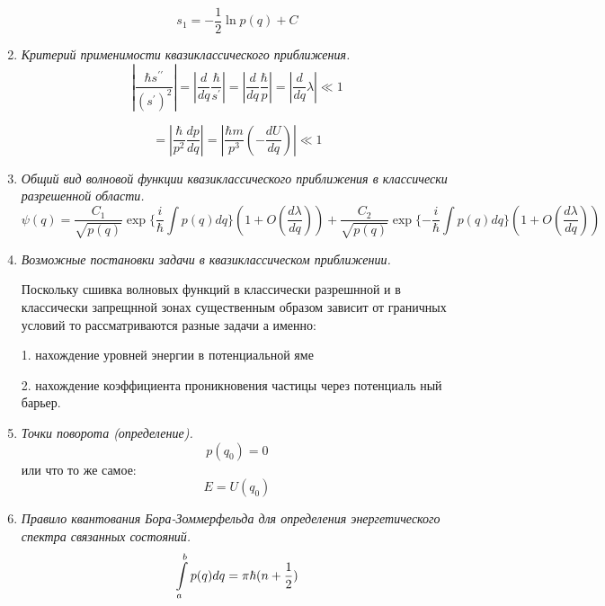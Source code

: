 \documentclass{article}
\begin{document}
\begin{enumerate}
\begin{equation}
s_{1}=-\frac{1}{2}\ln p(q)+C
\end{equation}


		\item \textit{Критерий применимости квазиклассического приближения.}  
\begin{equation}
|\frac{\hbar s^{\prime\prime}}{(s^{\prime})^{2}}|=|\frac{d}{dq}\frac{\hbar}{s^{\prime}}|=|\frac{d}{dq}\frac{\hbar}{p}|=|\frac{d}{dq}\lambda|\ll1
\end{equation}


\begin{equation}
=|\frac{\hbar}{p^{2}}\frac{dp}{dq}|=|\frac{\hbar m}{p^{3}}(-\frac{dU}{dq})|\ll1
\end{equation}


		\item \textit{Общий вид волновой функции квазиклассического приближения в классически разрешенной области.} 
\begin{equation}
\psi(q)=\frac{C_{1}}{\sqrt{p(q)}}\exp\{\frac{i}{\hbar}\int p(q)dq\}(1+O(\frac{d\lambda}{dq}))+\frac{C_{2}}{\sqrt{p(q)}}\exp\{-\frac{i}{\hbar}\int p(q)dq\}(1+O(\frac{d\lambda}{dq}))
\end{equation}


		\item \textit{Возможные постановки задачи в квазиклассическом приближении.} 
		
		Поскольку сшивка волновых функций в классически разрешнной и в
классически запрещнной зонах существенным образом зависит от граничных
условий то рассматриваются разные задачи а именно:

1. нахождение уровней энергии в потенциальной яме

2. нахождение коэффициента проникновения частицы через потенциаль
ный барьер.

		\item \textit{Точки поворота (определение).}  
\begin{equation}
p(q_{0})=0
\end{equation}
или что то же самое:
\begin{equation}
E=U(q_{0})
\end{equation}


		\item \textit{Правило квантования Бора-Зоммерфельда для определения энергетического спектра связанных состояний.}  
\begin{equation}
\intop_{a}^{b}p(q)dq=\pi\hbar(n+\frac{1}{2})
\end{equation}



\end{enumerate}
\end{document}

